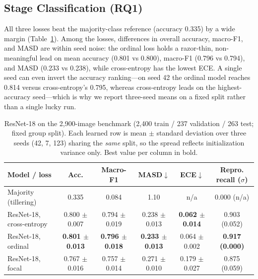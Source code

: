 \documentclass[conference]{IEEEtran}
\begin{document}

\subsection{Stage Classification (RQ1)}

All three losses beat the majority-class reference (accuracy 0.335) by a wide margin (Table~\ref{tab:results}). Among the losses, differences in overall accuracy, macro-F1, and MASD are within seed noise: the ordinal loss holds a razor-thin, non-meaningful lead on mean accuracy (0.801 vs 0.800), macro-F1 (0.796 vs 0.794), and MASD (0.233 vs 0.238), while cross-entropy has the lowest ECE. A single seed can even invert the accuracy ranking---on seed 42 the ordinal model reaches 0.814 versus cross-entropy's 0.795, whereas cross-entropy leads on the highest-accuracy seed---which is why we report three-seed means on a fixed split rather than a single lucky run.

\begin{table}[t]
\centering
\caption{ResNet-18 on the 2{,}900-image benchmark (2{,}400 train / 237 validation / 263 test; fixed group split). Each learned row is mean $\pm$ standard deviation over three seeds (42, 7, 123) sharing the \emph{same} split, so the spread reflects initialization variance only. Best value per column in bold.}
\label{tab:results}
\small
\begin{tabular}{lccccc}
\toprule
\textbf{Model / loss} & \textbf{Acc.} & \textbf{Macro-F1} & \textbf{MASD}$\downarrow$ & \textbf{ECE}$\downarrow$ & \textbf{Repro. recall ($\sigma$)} \\
\midrule
Majority (tillering) & 0.335 & 0.084 & 1.10 & n/a & 0.000 (n/a) \\
ResNet-18, cross-entropy & 0.800 $\pm$ 0.007 & 0.794 $\pm$ 0.019 & 0.238 $\pm$ 0.013 & \textbf{0.062 $\pm$ 0.014} & 0.903 (0.052) \\
ResNet-18, ordinal & \textbf{0.801 $\pm$ 0.013} & \textbf{0.796 $\pm$ 0.018} & \textbf{0.233 $\pm$ 0.013} & 0.064 $\pm$ 0.002 & \textbf{0.917 (0.000)} \\
ResNet-18, focal & 0.767 $\pm$ 0.016 & 0.757 $\pm$ 0.014 & 0.271 $\pm$ 0.010 & 0.179 $\pm$ 0.027 & 0.875 (0.059) \\
\bottomrule
\end{tabular}
\end{table}
\end{document}
